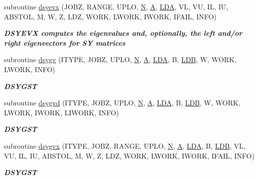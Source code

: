 \begin{DoxyCompactItemize}
subroutine \hyperlink{group__doubleSYeigen_ga68612cdf4ed1051c08f0b0735b8dfdea}{dsyevx} (J\+O\+B\+Z, R\+A\+N\+G\+E, U\+P\+L\+O, \hyperlink{polmisc_8c_a0240ac851181b84ac374872dc5434ee4}{N}, \hyperlink{classA}{A}, \hyperlink{example__user_8c_ae946da542ce0db94dced19b2ecefd1aa}{L\+D\+A}, V\+L, V\+U, I\+L, I\+U, A\+B\+S\+T\+O\+L, M, W, Z, L\+D\+Z, W\+O\+R\+K, L\+W\+O\+R\+K, I\+W\+O\+R\+K, I\+F\+A\+I\+L, I\+N\+F\+O)
\begin{DoxyCompactList}\small\item\em {\bfseries  D\+S\+Y\+E\+V\+X computes the eigenvalues and, optionally, the left and/or right eigenvectors for S\+Y matrices} \end{DoxyCompactList}\item 
subroutine \hyperlink{group__doubleSYeigen_ga007d33bcdcc697e17c6d15432f159b73}{dsygv} (I\+T\+Y\+P\+E, J\+O\+B\+Z, U\+P\+L\+O, \hyperlink{polmisc_8c_a0240ac851181b84ac374872dc5434ee4}{N}, \hyperlink{classA}{A}, \hyperlink{example__user_8c_ae946da542ce0db94dced19b2ecefd1aa}{L\+D\+A}, B, \hyperlink{example__user_8c_a50e90a7104df172b5a89a06c47fcca04}{L\+D\+B}, W, W\+O\+R\+K, L\+W\+O\+R\+K, I\+N\+F\+O)
\begin{DoxyCompactList}\small\item\em {\bfseries D\+S\+Y\+G\+S\+T} \end{DoxyCompactList}\item 
subroutine \hyperlink{group__doubleSYeigen_ga912ae48bb1650b2c7174807ffa5456ca}{dsygvd} (I\+T\+Y\+P\+E, J\+O\+B\+Z, U\+P\+L\+O, \hyperlink{polmisc_8c_a0240ac851181b84ac374872dc5434ee4}{N}, \hyperlink{classA}{A}, \hyperlink{example__user_8c_ae946da542ce0db94dced19b2ecefd1aa}{L\+D\+A}, B, \hyperlink{example__user_8c_a50e90a7104df172b5a89a06c47fcca04}{L\+D\+B}, W, W\+O\+R\+K, L\+W\+O\+R\+K, I\+W\+O\+R\+K, L\+I\+W\+O\+R\+K, I\+N\+F\+O)
\begin{DoxyCompactList}\small\item\em {\bfseries D\+S\+Y\+G\+S\+T} \end{DoxyCompactList}\item 
subroutine \hyperlink{group__doubleSYeigen_ga51bef2d9d58cfff3f1bac9143ccc85b8}{dsygvx} (I\+T\+Y\+P\+E, J\+O\+B\+Z, R\+A\+N\+G\+E, U\+P\+L\+O, \hyperlink{polmisc_8c_a0240ac851181b84ac374872dc5434ee4}{N}, \hyperlink{classA}{A}, \hyperlink{example__user_8c_ae946da542ce0db94dced19b2ecefd1aa}{L\+D\+A}, B, \hyperlink{example__user_8c_a50e90a7104df172b5a89a06c47fcca04}{L\+D\+B}, V\+L, V\+U, I\+L, I\+U, A\+B\+S\+T\+O\+L, M, W, Z, L\+D\+Z, W\+O\+R\+K, L\+W\+O\+R\+K, I\+W\+O\+R\+K, I\+F\+A\+I\+L, I\+N\+F\+O)
\begin{DoxyCompactList}\small\item\em {\bfseries D\+S\+Y\+G\+S\+T} \end{DoxyCompactList}\end{DoxyCompactItemize}


